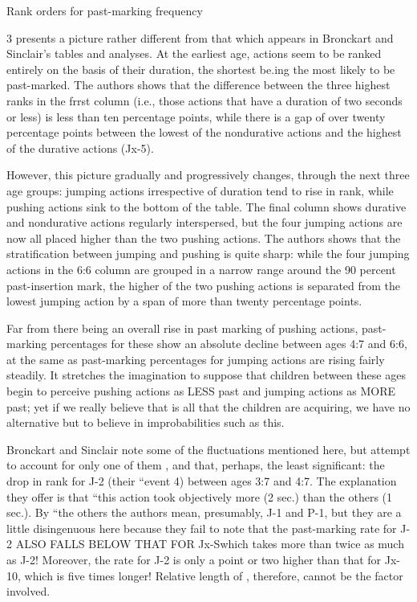 Rank orders for past-marking frequency

\begin{table}
\caption{3 presents a picture rather different from that which appears in Bronckart and Sinclair's tables and analyses. At the earliest age, actions seem to be ranked entirely on the basis of their duration, the shortest be.ing the most likely to be past-marked. The authors  shows that the difference between the three highest ranks in the frrst column (i.e., those actions that have a duration of two seconds or less) is less than ten percentage points, while there is a gap of over twenty percentage points between the lowest of the nondurative actions and the highest of the durative actions (Jx-5).}
\label{tab:3}
\end{table}

However, this picture gradually and progressively changes, through the next three age groups: jumping actions irrespective of duration tend to rise in rank, while pushing actions sink to the bottom of the table. The final column shows durative and nondurative actions regularly interspersed, but the four jumping actions are now all placed higher than the two pushing actions. The authors shows that the stratification between jumping and pushing is quite sharp: while the
four jumping actions in the 6:6 column are grouped in a narrow range around the 90 percent past-insertion mark, the higher of the two push\-ing actions is separated from the lowest jumping action by a span of more than twenty percentage points.

Far from there being an overall rise in past marking of pushing actions, past-marking percentages for these show an absolute decline between ages 4:7 and 6:6, at the same  as past-marking percentages for jumping actions are rising fairly steadily. It stretches the imagina\-tion to suppose that children between these ages begin to perceive pushing actions as LESS past and jumping actions as MORE past; yet if we really believe that  is all that the children are ac\-quiring, we have no alternative but to believe in improbabilities such as this.

Bronckart and Sinclair note some of the fluctuations mentioned here, but attempt to account for only one of them , and that, perhaps, the least significant: the drop in rank for J-2 (their ``event 4{\textquotedbl}) be\-tween ages 3:7 and 4:7. The explanation they offer is that ``this action took objectively more  (2 sec.) than the others (1 sec.). By ``the others the authors mean, presumably, J-1 and P-1, but they are a little disingenuous here because they fail to note that the past-marking rate for J-2 ALSO FALLS BELOW THAT FOR Jx-Swhich takes more than twice as much  as J-2! Moreover, the rate for J-2 is only a point or two higher than that for Jx-10, which is five times longer! Relative length of , therefore, cannot be the factor involved.

